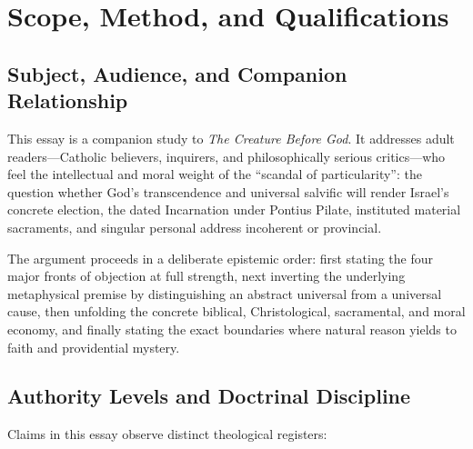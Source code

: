 \section{Scope, Method, and Qualifications}

\subsection*{Subject, Audience, and Companion Relationship}

This essay is a companion study to \textit{The Creature Before God}. It addresses adult readers---Catholic believers, inquirers, and philosophically serious critics---who feel the intellectual and moral weight of the ``scandal of particularity'': the question whether God's transcendence and universal salvific will render Israel's concrete election, the dated Incarnation under Pontius Pilate, instituted material sacraments, and singular personal address incoherent or provincial.

The argument proceeds in a deliberate epistemic order: first stating the four major fronts of objection at full strength, next inverting the underlying metaphysical premise by distinguishing an abstract universal from a universal cause, then unfolding the concrete biblical, Christological, sacramental, and moral economy, and finally stating the exact boundaries where natural reason yields to faith and providential mystery.

\subsection*{Authority Levels and Doctrinal Discipline}

Claims in this essay observe distinct theological registers:

